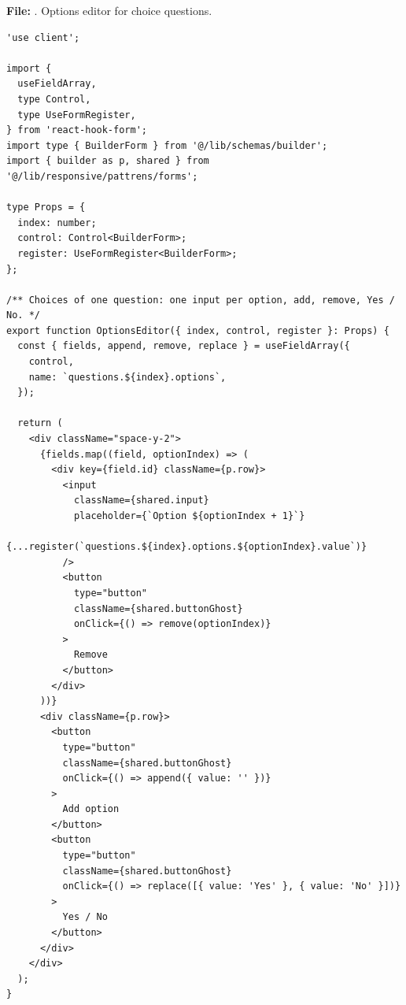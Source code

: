 \documentclass[11pt,a4paper]{article}
\begin{document}
\textbf{File:} . Options editor for choice questions.\par
\begin{lstlisting}
'use client';

import {
  useFieldArray,
  type Control,
  type UseFormRegister,
} from 'react-hook-form';
import type { BuilderForm } from '@/lib/schemas/builder';
import { builder as p, shared } from '@/lib/responsive/pattrens/forms';

type Props = {
  index: number;
  control: Control<BuilderForm>;
  register: UseFormRegister<BuilderForm>;
};

/** Choices of one question: one input per option, add, remove, Yes / No. */
export function OptionsEditor({ index, control, register }: Props) {
  const { fields, append, remove, replace } = useFieldArray({
    control,
    name: `questions.${index}.options`,
  });

  return (
    <div className="space-y-2">
      {fields.map((field, optionIndex) => (
        <div key={field.id} className={p.row}>
          <input
            className={shared.input}
            placeholder={`Option ${optionIndex + 1}`}
            {...register(`questions.${index}.options.${optionIndex}.value`)}
          />
          <button
            type="button"
            className={shared.buttonGhost}
            onClick={() => remove(optionIndex)}
          >
            Remove
          </button>
        </div>
      ))}
      <div className={p.row}>
        <button
          type="button"
          className={shared.buttonGhost}
          onClick={() => append({ value: '' })}
        >
          Add option
        </button>
        <button
          type="button"
          className={shared.buttonGhost}
          onClick={() => replace([{ value: 'Yes' }, { value: 'No' }])}
        >
          Yes / No
        </button>
      </div>
    </div>
  );
}
\end{lstlisting}
\end{document}
